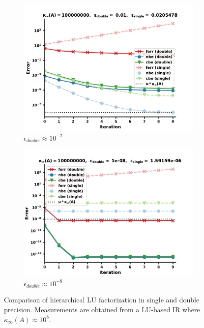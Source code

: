 \begin{figure}
\centering
\begin{subfigure}{.5\textwidth}
  \centering
  \includegraphics[width=\linewidth]{chapters/5_experiments/figures/LU512_e3_0s.pdf}
  \caption{$\epsilon_{double} \approx 10^{-2}$}
  \label{fig:lrirs4_1}
\end{subfigure}%
\begin{subfigure}{.5\textwidth}
  \centering
  \includegraphics[width=\linewidth]{chapters/5_experiments/figures/LU512_e3_1s.pdf}
  \caption{$\epsilon_{double} \approx 10^{-8}$}
  \label{fig:lrirs4_2}
\end{subfigure}
\caption[Mixed Precision Low-Rank LU-IR 4]{Comparison of hierarchical LU factorization in single and double precision. Measurements are obtained from a LU-based IR where $\kappa_\infty(A) \approx 10^8$.}
\label{fig:lrirs4}
\end{figure}

